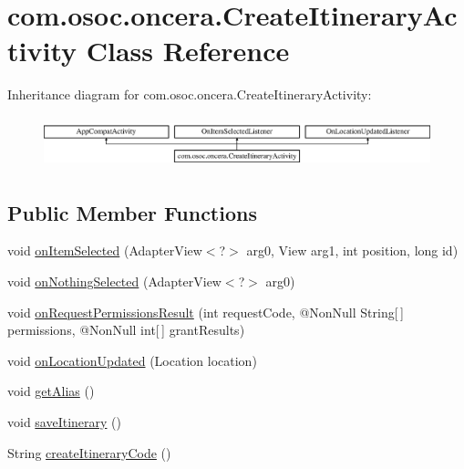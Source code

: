 \hypertarget{classcom_1_1osoc_1_1oncera_1_1_create_itinerary_activity}{}\section{com.\+osoc.\+oncera.\+Create\+Itinerary\+Activity Class Reference}
\label{classcom_1_1osoc_1_1oncera_1_1_create_itinerary_activity}
Inheritance diagram for com.\+osoc.\+oncera.\+Create\+Itinerary\+Activity\+:\begin{figure}[H]
\begin{center}
\leavevmode
\includegraphics[height=1.499331cm]{classcom_1_1osoc_1_1oncera_1_1_create_itinerary_activity}
\end{center}
\end{figure}
\subsection*{Public Member Functions}
\begin{DoxyCompactItemize}
\item 
void \mbox{\hyperlink{classcom_1_1osoc_1_1oncera_1_1_create_itinerary_activity_a261cfc0fbee2132193261a25a5130355}{on\+Item\+Selected}} (Adapter\+View$<$?$>$ arg0, View arg1, int position, long id)
\item 
void \mbox{\hyperlink{classcom_1_1osoc_1_1oncera_1_1_create_itinerary_activity_adc4f83dfe9f79bf22aace2368c130e9b}{on\+Nothing\+Selected}} (Adapter\+View$<$?$>$ arg0)
\item 
void \mbox{\hyperlink{classcom_1_1osoc_1_1oncera_1_1_create_itinerary_activity_a4bbc27a848ff24ef1759544b5a91dc28}{on\+Request\+Permissions\+Result}} (int request\+Code, @Non\+Null String\mbox{[}$\,$\mbox{]} permissions, @Non\+Null int\mbox{[}$\,$\mbox{]} grant\+Results)
\item 
void \mbox{\hyperlink{classcom_1_1osoc_1_1oncera_1_1_create_itinerary_activity_a0f3b19f5b4dde0e366a5f29c29fd4bae}{on\+Location\+Updated}} (Location location)
\item 
void \mbox{\hyperlink{classcom_1_1osoc_1_1oncera_1_1_create_itinerary_activity_aa346c6d0c42a870a7868be7a21b47eb5}{get\+Alias}} ()
\item 
void \mbox{\hyperlink{classcom_1_1osoc_1_1oncera_1_1_create_itinerary_activity_addc7b773e16619587ff9dbbc0097740c}{save\+Itinerary}} ()
\item 
String \mbox{\hyperlink{classcom_1_1osoc_1_1oncera_1_1_create_itinerary_activity_a9a403b6a9b06144fa44757b687873e95}{create\+Itinerary\+Code}} ()
\end{DoxyCompactItemize}
